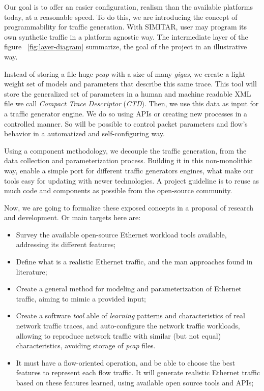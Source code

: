 Our goal is to offer an easier configuration, realism than the available platforms today, at a reasonable speed. To do this, we are introducing the concept of programmability for  traffic generation. With SIMITAR, user may program its own synthetic traffic in a platform agnostic way. The intermediate layer of the figure ~\ref{fig:layer-diagram} summarize, the goal of the project in an illustrative way.


Instead of storing a file huge \textit{pcap} with a size of many \textit{gigas}, we create a light-weight set of models and parameters that describe this same trace. This tool will store the generalized set of parameters in a human and machine readable XML file we call \textit{Compact Trace Descriptor} (\textit{CTD}). Then, we use this data as input for a traffic generator engine. We do so using APIs or creating new processes in a controlled manner. So will be possible to control packet parameters and flow's behavior in a automatized and self-configuring way.


Using a component methodology, we decouple the traffic generation, from the data collection and parameterization process. Building it in this non-monolithic way,  enable a simple port for different traffic generators engines, what make our tools easy for updating with newer technologies. A project guideline is to reuse as much code and components as possible from the open-source community.


Now, we are going to formalize these exposed concepts in a proposal of research and development. Or main targets here are:

\begin{itemize}


\item Survey the available open-source Ethernet workload tools available, addressing its different features;


\item Define what is a realistic Ethernet traffic, and the man approaches found in literature;


\item Create a general method for modeling and parameterization of Ethernet traffic, aiming to mimic a provided input;


\item Create a software \textit{tool} able of \textit{learning} patterns and characteristics of real network traffic traces, and auto-configure the network traffic workloads, allowing to reproduce network traffic with similar (but not equal) characteristics, avoiding storage of \textit{pcap} files. 


\item It must have a flow-oriented operation, and be able to choose the best features to represent each flow traffic. It will generate realistic Ethernet traffic based on these features learned, using available open source tools and APIs;


\end{itemize}


